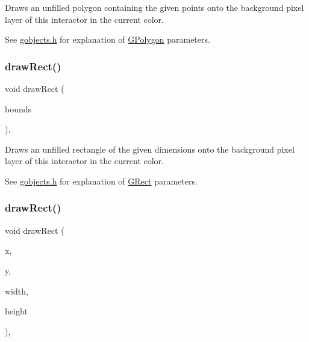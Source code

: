 Draws an unfilled polygon containing the given points onto the background pixel layer of this interactor in the current color. 

See \mbox{\hyperlink{gobjects_8h_source}{gobjects.\+h}} for explanation of \mbox{\hyperlink{classGPolygon}{G\+Polygon}} parameters. \mbox{\label{classGDrawingSurface_a3dd4cc5891149dfc36746264f7289877}} 
\subsubsection{\texorpdfstring{draw\+Rect()}{drawRect()}\hspace{0.1cm}{\footnotesize\ttfamily [1/2]}}
{\footnotesize\ttfamily void draw\+Rect (\begin{DoxyParamCaption}\item[{const \mbox{\hyperlink{classGRectangle}{G\+Rectangle}} \&}]{bounds }\end{DoxyParamCaption})\hspace{0.3cm}{\ttfamily [virtual]}, {\ttfamily [inherited]}}



Draws an unfilled rectangle of the given dimensions onto the background pixel layer of this interactor in the current color. 

See \mbox{\hyperlink{gobjects_8h_source}{gobjects.\+h}} for explanation of \mbox{\hyperlink{classGRect}{G\+Rect}} parameters. \mbox{\label{classGDrawingSurface_a4148e770ffc5474153aadd4814dbd708}} 
\subsubsection{\texorpdfstring{draw\+Rect()}{drawRect()}\hspace{0.1cm}{\footnotesize\ttfamily [2/2]}}
{\footnotesize\ttfamily void draw\+Rect (\begin{DoxyParamCaption}\item[{double}]{x,  }\item[{double}]{y,  }\item[{double}]{width,  }\item[{double}]{height }\end{DoxyParamCaption})\hspace{0.3cm}{\ttfamily [virtual]}, {\ttfamily [inherited]}}



